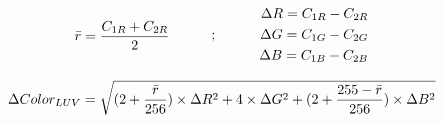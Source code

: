 \begin{equation}
\begin{split}
\label{eq:RedMeanRGBDiff}
\bar{r} = \frac{C_{1R} + C_{2R}}{2}
\end{split}
\quad\quad\quad ; \quad\quad\quad
 \begin{split}
\Delta R = C_{1R} - C_{2R}\\ 
\Delta G = C_{1G} - C_{2G}\\ 
\Delta B = C_{1B} - C_{2B}
 \end{split}
\end{equation}

\begin{equation}
\label{eq:DiffColorLUV}
\Delta Color_{LUV} = \sqrt{(2 + \frac{\bar{r}}{256}) \times \Delta R^{2} + 4 \times \Delta G^{2} + (2 + \frac{255 - \bar{r}}{256}) \times \Delta B^{2} }
\end{equation}







